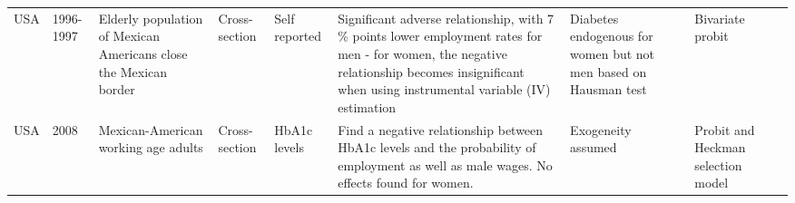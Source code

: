 \documentclass[12pt,english]{article}
\begin{document}
{\begin{landscape}
\begin{tabularx}{\linewidth}{m m m m b b b b m}
			USA       & 1996-1997  & Elderly population of Mexican Americans close the Mexican border & Cross-section           & Self reported                                & Significant adverse relationship, with 7 \% points lower employment rates for men - for women, the negative relationship becomes insignificant when using instrumental variable (IV) estimation                                                                                                                                                                                                                                                                                                                                                                                                                                                                  & Diabetes endogenous for women but not men based on Hausman test                         & Bivariate probit                                                                                                                                                                                                                                                                                     & \textcite{Brown2005}            \\
			USA       & 2008       & Mexican-American working age adults                              & Cross-section           & HbA1c levels                                 & Find a negative  relationship between HbA1c levels and the probability of employment as well as male wages. No effects found for women.                                                                                                                                                                                                                                                                                                                                                                                                                                                                                                                      & Exogeneity assumed                                                                      & Probit and Heckman selection model                                                                                                                                                                                                                                                                   & \textcite{BrownIII2011}            \\

\end{tabularx}
\end{landscape}}
\end{document}
